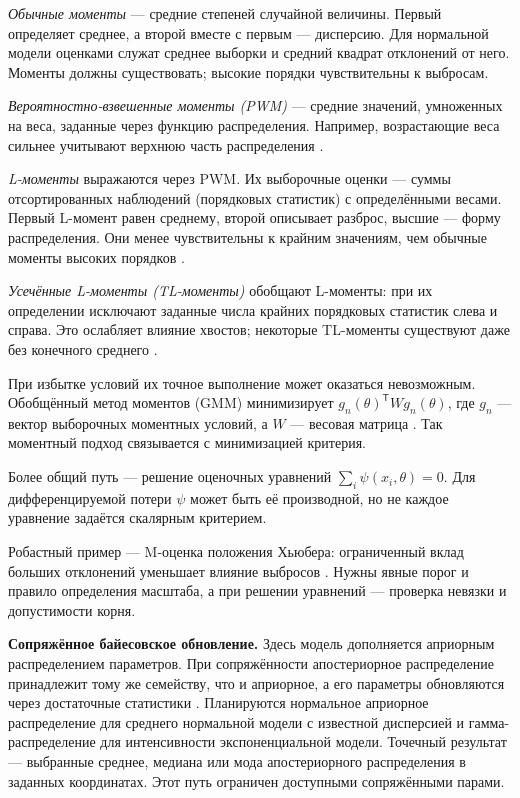 \emph{Обычные моменты} --- средние степеней случайной величины.
Первый определяет среднее, а второй вместе с первым --- дисперсию.
Для нормальной модели оценками служат среднее выборки и средний квадрат
отклонений от него. Моменты должны существовать; высокие порядки
чувствительны к выбросам.

\emph{Вероятностно-взвешенные моменты (PWM)} --- средние значений,
умноженных на веса, заданные через функцию распределения.
Например, возрастающие веса сильнее учитывают верхнюю часть распределения
\cite{reviewGreenwood}.

\emph{L-моменты} выражаются через PWM. Их выборочные оценки --- суммы
отсортированных наблюдений (порядковых статистик) с определёнными весами.
Первый L-момент равен
среднему, второй описывает разброс, высшие --- форму распределения.
Они менее чувствительны к крайним значениям, чем обычные моменты высоких
порядков \cite{reviewHosking}.

\emph{Усечённые L-моменты (TL-моменты)} обобщают L-моменты: при их определении
исключают заданные числа крайних порядковых статистик слева и справа.
Это ослабляет влияние хвостов; некоторые TL-моменты существуют даже
без конечного среднего \cite{reviewHoskingTL}.

При избытке условий их точное выполнение может оказаться невозможным.
Обобщённый метод моментов (GMM) минимизирует
$g_n(\theta)^{\mathsf T}Wg_n(\theta)$, где $g_n$ --- вектор выборочных
моментных условий, а $W$ --- весовая матрица \cite{reviewHansen}.
Так моментный подход связывается с минимизацией критерия.

Более общий путь --- решение оценочных уравнений
$\sum_i\psi(x_i,\theta)=0$. Для дифференцируемой потери $\psi$ может быть
её производной, но не каждое уравнение задаётся скалярным критерием.

Робастный пример --- M-оценка положения Хьюбера: ограниченный вклад
больших отклонений уменьшает влияние выбросов \cite{reviewHuber}.
Нужны явные порог и правило определения масштаба, а при решении
уравнений --- проверка невязки и допустимости корня.

\textbf{Сопряжённое байесовское обновление.}
Здесь модель дополняется априорным распределением параметров.
При сопряжённости апостериорное распределение принадлежит тому же
семейству, что и априорное, а его параметры обновляются через достаточные
статистики \cite{reviewDiaconis}. Планируются нормальное априорное
распределение для среднего нормальной модели с известной дисперсией
и гамма-распределение для интенсивности экспоненциальной модели.
Точечный результат --- выбранные среднее, медиана или мода
апостериорного распределения в заданных координатах.
Этот путь ограничен доступными сопряжёнными парами.

